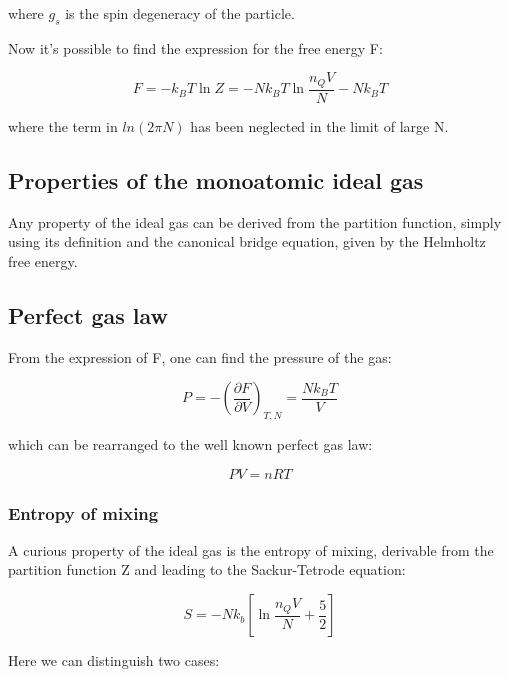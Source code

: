 \documentclass{article}
\begin{document}
where $g_s$ is the spin degeneracy of the particle.

Now it's possible to find the expression for the free energy F:

\begin{equation}
    F=-k_BT\ln{Z}=-Nk_BT\ln{\frac{n_QV}{N}}-Nk_BT
\end{equation}

where the term in $ln(2\pi N)$ has been neglected in the limit of large N.


\subsection{Properties of the monoatomic ideal gas}

Any property of the ideal gas can be derived from the partition function,
simply using its definition and the canonical bridge equation, given by the Helmholtz free energy.

\subsection{Perfect gas law}

From the expression of F, one can find the pressure of the gas:

\begin{equation}
    P=-\left(\frac{\partial F}{\partial V}\right)_{T,N}=\frac{Nk_BT}{V}
\end{equation}

which can be rearranged to the well known perfect gas law:

\begin{equation}
    PV=nRT
\end{equation}


\subsubsection{Entropy of mixing}

A curious property of the ideal gas is the entropy of mixing, derivable from the partition function Z and
leading to the Sackur-Tetrode equation:

\begin{equation}
    S=-Nk_b\left[\ln{\frac{n_QV}{N}}+\frac{5}{2}\right]
\end{equation}

Here we can distinguish two cases:
\end{document}
